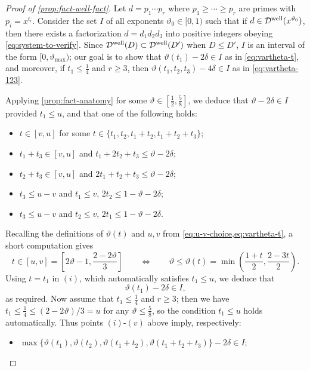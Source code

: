 \documentclass[reqno,11pt]{amsart}
\theoremstyle{remark}
\numberwithin{equation}{section}
\newcommand{\mDw}{\mathcal{D}^{\textnormal{well}}}
\begin{document}
\begin{proof}[Proof of \cref{prop:fact-well-fact}]
Let $d = p_1\cdots p_r$ where $p_1 \ge \cdots \ge p_r$ are primes with $p_i = x^{t_i}$. Consider the set $I$ of all exponents $\vartheta_0 \in [0, 1)$ such that if $d \in \mDw(x^{\vartheta_0})$, then there exists a factorization $d = d_1 d_2 d_3$ into positive integers obeying \cref{eq:system-to-verify}. Since $\mDw(D) \subset \mDw(D')$ when $D \le D'$, $I$ is an interval of the form $[0, \vartheta_{\max})$; our goal is to show that $\vartheta(t_1) - 2\delta \in I$ as in \cref{eq:vartheta-t}, and moreover, if $t_1 \le \tfrac{1}{4}$ and $r \ge 3$, then $\vartheta(t_1, t_2, t_3) - 4\delta \in I$ as in \cref{eq:vartheta-123}.

Applying \cref{prop:fact-anatomy} for some $\vartheta \in [\tfrac{1}{2}, \tfrac{5}{8}]$, we deduce that $\vartheta - 2\delta \in I$ provided $t_1 \le u$, and that one of the following holds:
\begin{itemize}
    \item[$(i)$.] $t \in [v, u]$ for some $t \in \{t_1, t_2, t_1 + t_2, t_1 + t_2 + t_3\}$;
    \item[$(ii)$.] $t_1 + t_3 \in [v, u]$ and $t_1 + 2t_2 + t_3 \le \vartheta - 2\delta$;
    \item[$(iii)$.] $t_2 + t_3 \in [v, u]$ and $2t_1 + t_2 + t_3 \le \vartheta - 2\delta$;
    \item[$(iv)$.] $t_3 \le u - v$ and $t_1 \le v$, $2t_2 \le 1 - \vartheta - 2\delta$;
    \item[$(v)$.] $t_3 \le u - v$ and $t_2 \le v$, $2t_1 \le 1 - \vartheta - 2\delta$.
\end{itemize}
Recalling the definitions of $\vartheta(t)$ and $u, v$ from \cref{eq:u-v-choice,eq:vartheta-t}, a short computation gives
\[
    t \in [u, v] = \left[2\vartheta - 1, \frac{2-2\vartheta}{3} \right] \qquad \iff \qquad \vartheta \le \vartheta(t) = \min\left(\frac{1+t}{2}, \frac{2-3t}{2}\right).
\]
Using $t = t_1$ in $(i)$, which automatically satisfies $t_1 \le u$, we deduce that 
\[
    \vartheta(t_1) - 2\delta \in I,
\]
as required. Now assume that $t_1 \le \tfrac{1}{4}$ and $r \ge 3$; then we have $t_1 \le \tfrac{1}{4} \le (2-2\vartheta)/3 = u$ for any $\vartheta \le \tfrac{5}{8}$, so the condition $t_1 \le u$ holds automatically. Thus points $(i)$-$(v)$ above imply, respectively:
\begin{itemize}
    \item[$(i)$.] $\max\{\vartheta(t_1), \vartheta(t_2), \vartheta(t_1+t_2), \vartheta(t_1+t_2+t_3)\} - 2\delta \in I$;

\end{itemize}
\end{proof}
\end{document}
